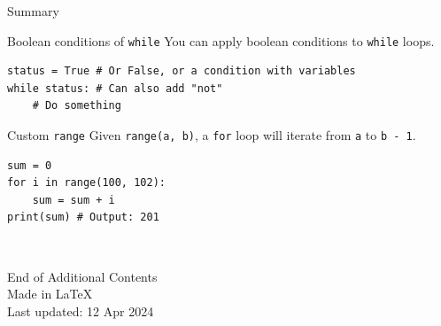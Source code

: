 \documentclass[dvipsnames, svgnames, x11names, handout]{beamer}
\begin{document}
\begin{frame}[fragile]{Summary}
\begin{block}{Boolean conditions of \texttt{while}}
You can apply boolean conditions to \texttt{while} loops.
\begin{verbatim}
status = True # Or False, or a condition with variables
while status: # Can also add "not"
    # Do something
\end{verbatim}
\end{block}

\begin{block}{Custom \texttt{range}}
Given \texttt{range(a, b)}, a \texttt{for} loop will iterate from \texttt{a} to \texttt{b - 1}.
\begin{verbatim}
sum = 0
for i in range(100, 102):
    sum = sum + i
print(sum) # Output: 201
\end{verbatim}
\end{block}
    
\end{frame}

\begin{frame}{ \ }
	\begin{center}
		End of Additional Contents\\
		Made in \LaTeX\\
		Last updated: 12 Apr 2024
	\end{center}
\end{frame}
\end{document}
